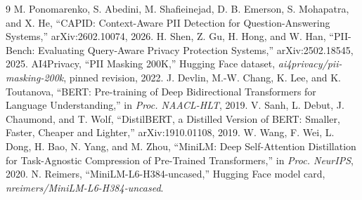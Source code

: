 \documentclass[conference]{IEEEtran}
\begin{document}
\begin{thebibliography}{9}
 M. Ponomarenko, S. Abedini, M. Shafieinejad, D. B. Emerson, S. Mohapatra, and X. He, ``CAPID: Context-Aware PII Detection for Question-Answering Systems,'' arXiv:2602.10074, 2026.
 H. Shen, Z. Gu, H. Hong, and W. Han, ``PII-Bench: Evaluating Query-Aware Privacy Protection Systems,'' arXiv:2502.18545, 2025.
 AI4Privacy, ``PII Masking 200K,'' Hugging Face dataset, \emph{ai4privacy/pii-masking-200k}, pinned revision, 2022.
 J. Devlin, M.-W. Chang, K. Lee, and K. Toutanova, ``BERT: Pre-training of Deep Bidirectional Transformers for Language Understanding,'' in \emph{Proc. NAACL-HLT}, 2019.
 V. Sanh, L. Debut, J. Chaumond, and T. Wolf, ``DistilBERT, a Distilled Version of BERT: Smaller, Faster, Cheaper and Lighter,'' arXiv:1910.01108, 2019.
 W. Wang, F. Wei, L. Dong, H. Bao, N. Yang, and M. Zhou, ``MiniLM: Deep Self-Attention Distillation for Task-Agnostic Compression of Pre-Trained Transformers,'' in \emph{Proc. NeurIPS}, 2020.
 N. Reimers, ``MiniLM-L6-H384-uncased,'' Hugging Face model card, \emph{nreimers/MiniLM-L6-H384-uncased}.
\end{thebibliography}
\end{document}
